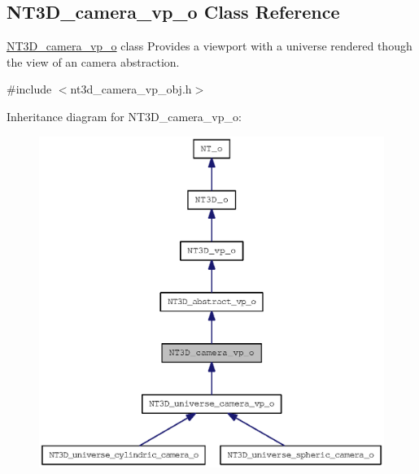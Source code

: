 \subsection{NT3D\_\-camera\_\-vp\_\-o Class Reference}
\label{class_n_t3_d__camera__vp__o}


\hyperlink{class_n_t3_d__camera__vp__o}{NT3D\_\-camera\_\-vp\_\-o} class Provides a viewport with a universe rendered though the view of an camera abstraction.  




{\ttfamily \#include $<$nt3d\_\-camera\_\-vp\_\-obj.h$>$}



Inheritance diagram for NT3D\_\-camera\_\-vp\_\-o:
\nopagebreak
\begin{figure}[H]
\begin{center}
\leavevmode
\includegraphics[width=400pt]{class_n_t3_d__camera__vp__o__inherit__graph}
\end{center}
\end{figure}


